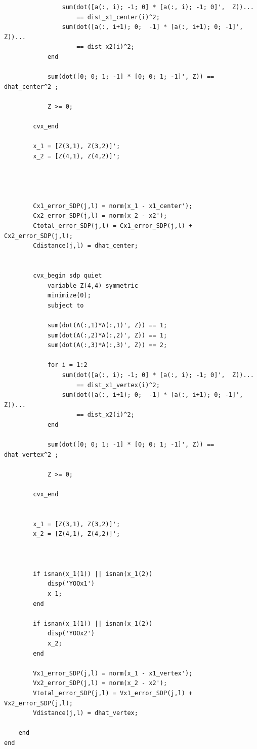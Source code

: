 \documentclass{article} %
\begin{document}
\begin{itemize}
\begin{lstlisting}
                sum(dot([a(:, i); -1; 0] * [a(:, i); -1; 0]',  Z))...
                    == dist_x1_center(i)^2;
                sum(dot([a(:, i+1); 0;  -1] * [a(:, i+1); 0; -1]', Z))...
                    == dist_x2(i)^2;
            end

            sum(dot([0; 0; 1; -1] * [0; 0; 1; -1]', Z)) == dhat_center^2 ;

            Z >= 0;

        cvx_end
        
        x_1 = [Z(3,1), Z(3,2)]';
        x_2 = [Z(4,1), Z(4,2)]';

        
        
            
        Cx1_error_SDP(j,l) = norm(x_1 - x1_center');
        Cx2_error_SDP(j,l) = norm(x_2 - x2');
        Ctotal_error_SDP(j,l) = Cx1_error_SDP(j,l) +  Cx2_error_SDP(j,l);
        Cdistance(j,l) = dhat_center;
        

        cvx_begin sdp quiet
            variable Z(4,4) symmetric
            minimize(0);
            subject to

            sum(dot(A(:,1)*A(:,1)', Z)) == 1;
            sum(dot(A(:,2)*A(:,2)', Z)) == 1;
            sum(dot(A(:,3)*A(:,3)', Z)) == 2;

            for i = 1:2
                sum(dot([a(:, i); -1; 0] * [a(:, i); -1; 0]',  Z))...
                    == dist_x1_vertex(i)^2;
                sum(dot([a(:, i+1); 0;  -1] * [a(:, i+1); 0; -1]', Z))...
                    == dist_x2(i)^2;
            end

            sum(dot([0; 0; 1; -1] * [0; 0; 1; -1]', Z)) == dhat_vertex^2 ;

            Z >= 0;

        cvx_end
        
        
        x_1 = [Z(3,1), Z(3,2)]';
        x_2 = [Z(4,1), Z(4,2)]';
        

        
        if isnan(x_1(1)) || isnan(x_1(2))
            disp('YOOx1')
            x_1;
        end
        
        if isnan(x_1(1)) || isnan(x_1(2))
            disp('YOOx2')
            x_2;
        end
        
        Vx1_error_SDP(j,l) = norm(x_1 - x1_vertex');
        Vx2_error_SDP(j,l) = norm(x_2 - x2');
        Vtotal_error_SDP(j,l) = Vx1_error_SDP(j,l) +  Vx2_error_SDP(j,l);
        Vdistance(j,l) = dhat_vertex;
        
    end
end
 

\end{lstlisting}
\end{itemize}
\end{document}
